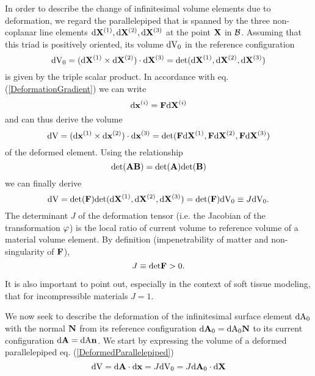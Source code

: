 In order to describe the change of infinitesimal volume elements due to deformation, we regard the parallelepiped that is spanned by the three non-coplanar line elements $\textnormal{d} \mathbf {X } ^{(1)},\textnormal{d} \mathbf {X } ^{(2)},\textnormal{d} \mathbf {X } ^{(3)}$ at the point $\mathbf {X} $ in $\mathcal{B} $. Assuming that this triad is positively oriented, its volume $ \textnormal{dV}_0$ in the reference configuration 
 \begin{equation}
 \textnormal{dV}_0 = (\textnormal{d} \mathbf {X }^{(1)} \times \textnormal{d} \mathbf {X }^{(2)}) \cdot \textnormal{d} \mathbf {X }^{(3)} =  \textnormal{det} (\textnormal{d} \mathbf {X } ^{(1)},\textnormal{d} \mathbf {X }^{(2)},\textnormal{d} \mathbf {X }^{(3)} )
\label{Parallelepiped}
\end{equation}
is given by the triple scalar product. In accordance with eq. (\ref{DeformationGradient}) we can write
 \begin{equation}
\textnormal{d} \mathbf {x }^{(i)} = \mathbf {F } \textnormal{d} \mathbf {X }^{(i)}
\end{equation}
and can thus derive the volume 
 \begin{equation}
 \textnormal{dV} = (\textnormal{d} \mathbf {x }^{(1)} \times \textnormal{d} \mathbf {x }^{(2)}) \cdot \textnormal{d} \mathbf {x }^{(3)} =  \textnormal{det} ( \mathbf {F } \textnormal{d} \mathbf {X } ^{(1)}, \mathbf {F } \textnormal{d} \mathbf {X } ^{(2)}, \mathbf {F } \textnormal{d} \mathbf {X } ^{(3)} )
\label{DeformedParallelepiped}
\end{equation}
of the deformed element. Using the relationship 
\begin{equation}
 \textnormal{det}(\mathbf A \mathbf B) =  \textnormal{det}(\mathbf A )  \textnormal{det}( \mathbf B)
\end{equation}
we can finally derive
 \begin{equation}
 \textnormal{dV} =   \textnormal{det} ( \mathbf {F } )  \textnormal{det} ( \textnormal{d} \mathbf {X } ^{(1)},  \textnormal{d} \mathbf {X } ^{(2)},  \textnormal{d} \mathbf {X } ^{(3)} ) =  \textnormal{det} ( \mathbf {F } )  \textnormal{dV}_0 \equiv J  \textnormal{dV}_0.
\end{equation}
The determinant $J$ of the deformation tensor (i.e. the Jacobian of the transformation $\varphi$) is the local ratio of current volume to reference volume of a material volume element. By definition (impenetrability of matter and non-singularity of $\mathbf {F }$), 
 \begin{equation}
J \equiv  \textnormal{det} \mathbf {F } > 0.
\end{equation}

It is also important to point out, especially in the context of soft tissue modeling, that for incompressible materials $J = 1$.

We now seek to describe the deformation of the infinitesimal surface element $ \textnormal{dA}_0$ with the normal $\mathbf {N} $ from its reference configuration $ \textnormal{d}\mathbf{A}_0=  \textnormal{dA}_0 \mathbf {N} $ to its current configuration $ \textnormal{d}\mathbf{A}=  \textnormal{dA} \mathbf {n} $. We start by expressing the volume of a deformed parallelepiped eq. (\ref{DeformedParallelepiped}) 
 \begin{equation}
 \textnormal{dV} =  \textnormal{d}\mathbf{A} \cdot \textnormal{d} \mathbf {x } = J  \textnormal{dV}_0 = J  \textnormal{d}\mathbf{A}_0 \cdot \textnormal{d} \mathbf {X }
\end{equation}

